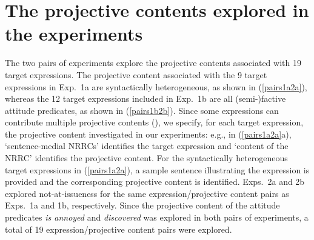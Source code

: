 \documentclass[11pt,fleqn]{article}
\newcommand{\6}{\mbox{$[\hspace*{-.6mm}[$}}
\newcommand{\9}{\mbox{$]\hspace*{-.6mm}]$}}
\begin{document}
\section{The projective contents explored in the experiments}\label{s2}

The two pairs of experiments explore the projective contents associated with 19 target expressions. The projective content associated with the 9 target expressions in Exp.~1a are syntactically heterogeneous, as shown in (\ref{pairs1a2a}), whereas the 12 target expressions included in Exp.~1b are all (semi-)factive attitude predicates, as shown in (\ref{pairs1b2b}). Since some expressions can contribute multiple projective contents (\citealt{brst-lang11}), we specify, for each target expression, the projective content investigated in our experiments: e.g., in (\ref{pairs1a2a}a), `sentence-medial NRRCs' identifies the target expression and `content of the NRRC' identifies the projective content. For the syntactically heterogeneous target expressions in (\ref{pairs1a2a}), a sample sentence illustrating the expression is provided and the corresponding projective content is identified. Exps.~2a and 2b explored not-at-issueness for the same expression/projective content pairs as Exps.~1a and 1b, respectively. Since the projective content of the attitude predicates {\em is annoyed} and {\em discovered} was explored in both pairs of experiments, a total of 19 expression/projective content pairs were explored. 
\end{document}
